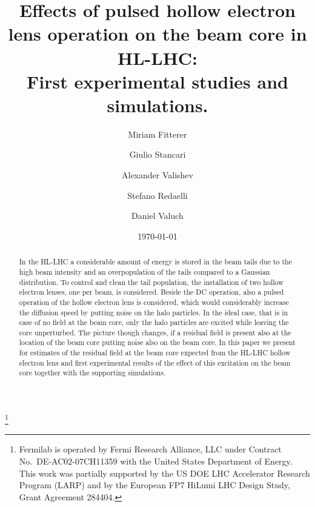 \documentclass[%
 reprint,
 amsmath,amssymb,
 aps,
prstab,
]{revtex4-1}
\begin{document}
\title{Effects of pulsed hollow electron lens operation on the beam core in HL-LHC: \\First experimental studies and simulations.}%
\thanks{Fermilab is operated by Fermi Research Alliance, LLC under
	Contract No.~DE-AC02-07CH11359 with the United States Department of
	Energy. This work was partially supported by the US DOE LHC
	Accelerator Research Program (LARP) and by the European FP7 HiLumi
	LHC Design Study, Grant Agreement 284404.}

\author{Miriam Fitterer}
\author{Giulio Stancari}%
\author{Alexander Valishev}%
%

\author{Stefano Redaelli}
\author{Daniel Valuch}
%

\date{\today}%

\begin{abstract}
In the HL-LHC a considerable amount of energy is stored in the beam tails due to the high beam intensity and an overpopulation of the tails compared to a Gaussian distribution. To control and clean the tail population, the installation of two hollow electron lenses, one per beam, is considered. Beside the DC operation, also a pulsed operation of the hollow electron lens is considered, which would considerably increase the diffusion speed by putting noise on the halo particles. In the ideal case, that is in case of no field at the beam core, only the halo particles are excited while leaving the core unperturbed. The picture though changes, if a residual field is present also at the location of the beam core putting noise also on the beam core. In this paper we present for estimates of the residual field at the beam core expected from the HL-LHC hollow electron lens and first experimental results of the effect of this excitation on the beam core together with the supporting simulations.
\end{abstract}


\maketitle
\end{document}
